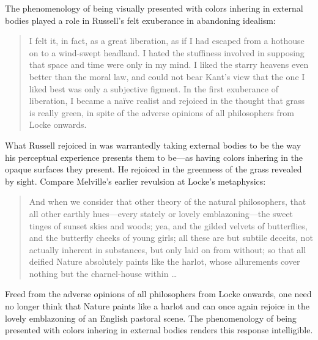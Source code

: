 \documentclass[12pt]{article}
\begin{document}
The phenomenology of being visually presented with colors inhering in external bodies played a role in Russell's felt exuberance in abandoning idealism:
\begin{quote}
	I felt it, in fact, as a great liberation, as if I had escaped from a hothouse on to a wind-swept headland. I hated the stuffiness involved in supposing that space and time were only in my mind. I liked the starry heavens even better than the moral law, and could not bear Kant’s view that the one I liked best was only a subjective figment. In the first exuberance of liberation, I became a naïve realist and rejoiced in the thought that grass is really green, in spite of the adverse opinions of all philosophers from Locke onwards. \citep[48]{Russell:1959fv}
\end{quote}
What Russell rejoiced in was warrantedly taking external bodies to be the way his perceptual experience presents them to be---as having colors inhering in the opaque surfaces they present. He rejoiced in the greenness of the grass revealed by sight. Compare Melville's earlier revulsion at Locke's metaphysics:
\begin{quote}
	And when we consider that other theory of the natural philosophers, that all other earthly hues---every stately or lovely emblazoning---the sweet tinges of sunset skies and woods; yea, and the gilded velvets of butterflies, and the butterfly cheeks of young girls; all these are but subtile deceits, not actually inherent in substances, but only laid on from without; so that all deified Nature absolutely paints like the harlot, whose allurements cover nothing but the charnel-house within \ldots\ \citep[ch. 42]{Melville:1851ms}
\end{quote}
Freed from the adverse opinions of all philosophers from Locke onwards, one need no longer think that Nature paints like a harlot and can once again rejoice in the lovely emblazoning of an English pastoral scene. The phenomenology of being presented with colors inhering in external bodies renders this response intelligible.
\end{document}
